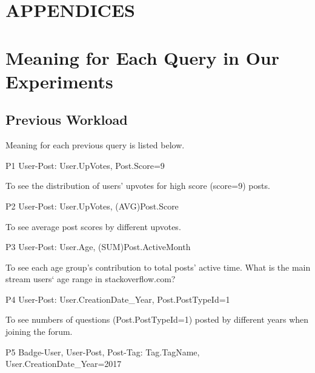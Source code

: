 \documentclass[letterpaper,12pt,titlepage,oneside,final]{book}
\begin{document}
\nocite{*}

\appendix
\chapter*{APPENDICES}
\chapter[PDF Plots From Matlab]{Meaning for Each Query in Our Experiments}
\label{AppendixA}
\section{Previous Workload}
\par
Meaning for each previous query is listed below.

P1 \hspace{3mm} User-Post: User.UpVotes, Post.Score=9

To see the distribution of users' upvotes for high score (score=9) posts.

P2 \hspace{3mm} User-Post: User.UpVotes, (AVG)Post.Score

To see average post scores by different upvotes.

P3 \hspace{3mm} User-Post: User.Age, (SUM)Post.ActiveMonth

To see each age group's contribution to total posts' active time. What is the main stream users` age range in stackoverflow.com?

P4 \hspace{3mm} User-Post: User.CreationDate\_Year, Post.PostTypeId=1

To see numbers of questions (Post.PostTypeId=1) posted by different years when joining the forum.

P5 \hspace{3mm} Badge-User, User-Post, Post-Tag: Tag.TagName, User.CreationDate\_Year=2017
\end{document}
